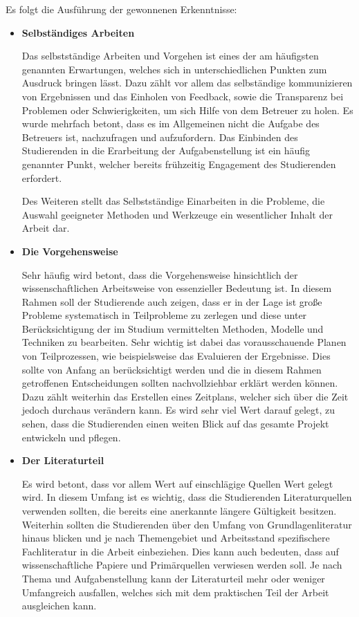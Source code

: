 \documentclass{scrreprt}
\begin{document}
\par\medskip Es folgt die Ausführung der gewonnenen Erkenntnisse:
\begin{itemize}
\item \textbf{Selbständiges Arbeiten}
\par Das selbstständige Arbeiten und Vorgehen ist eines der am häufigsten genannten Erwartungen, welches sich in unterschiedlichen Punkten zum Ausdruck bringen lässt. Dazu zählt vor allem das selbständige kommunizieren von Ergebnissen und das Einholen von Feedback, sowie die Transparenz bei Problemen oder Schwierigkeiten, um sich Hilfe von dem Betreuer zu holen. Es wurde mehrfach betont, dass es im Allgemeinen nicht die Aufgabe des Betreuers ist, nachzufragen und aufzufordern. Das Einbinden des Studierenden in die Erarbeitung der Aufgabenstellung ist ein häufig genannter Punkt, welcher bereits frühzeitig Engagement des Studierenden erfordert.
\par Des Weiteren stellt das Selbstständige Einarbeiten in die Probleme, die Auswahl geeigneter Methoden und Werkzeuge ein wesentlicher Inhalt der Arbeit dar.
\item \textbf{Die Vorgehensweise}
\par Sehr häufig wird betont, dass die Vorgehensweise hinsichtlich der wissenschaftlichen Arbeitsweise von essenzieller Bedeutung ist. In diesem Rahmen soll der Studierende auch zeigen, dass er in der Lage ist große Probleme systematisch in Teilprobleme zu zerlegen und diese unter Berücksichtigung der im Studium vermittelten Methoden, Modelle und Techniken zu bearbeiten. Sehr wichtig ist dabei das vorausschauende Planen von Teilprozessen, wie beispielsweise das Evaluieren der Ergebnisse. Dies sollte von Anfang an berücksichtigt werden und die in diesem Rahmen getroffenen Entscheidungen sollten nachvollziehbar erklärt werden können. Dazu zählt weiterhin das Erstellen eines Zeitplans, welcher sich über die Zeit jedoch durchaus verändern kann. Es wird sehr viel Wert darauf gelegt, zu sehen, dass die Studierenden einen weiten Blick auf das gesamte Projekt entwickeln und pflegen.
\item \textbf{Der Literaturteil}
\par Es wird betont, dass vor allem Wert auf einschlägige Quellen Wert gelegt wird. In diesem Umfang ist es wichtig, dass die Studierenden Literaturquellen verwenden sollten, die bereits eine anerkannte längere Gültigkeit besitzen. Weiterhin sollten die Studierenden über den Umfang von Grundlagenliteratur hinaus blicken und je nach Themengebiet und Arbeitsstand spezifischere Fachliteratur in die Arbeit einbeziehen. Dies kann auch bedeuten, dass auf wissenschaftliche Papiere und Primärquellen verwiesen werden soll. Je nach Thema und Aufgabenstellung kann der Literaturteil mehr oder weniger Umfangreich ausfallen, welches sich mit dem praktischen Teil der Arbeit ausgleichen kann.

\end{itemize}
\end{document}
